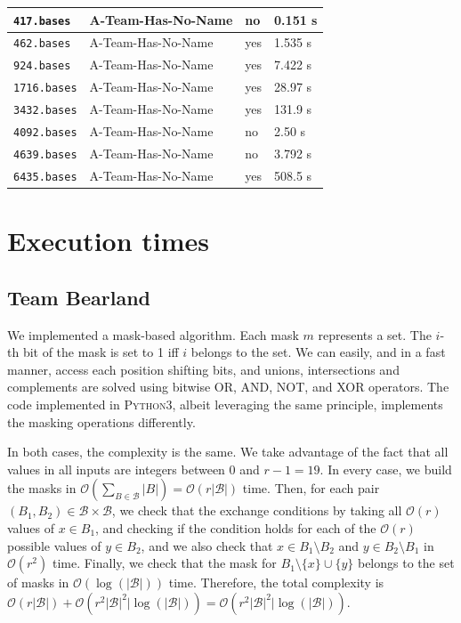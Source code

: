 \documentclass[11pt]{amsart}
\begin{document}
\begin{center}
\begin{tabular}[c]{llll}
    \\\hline
    \texttt{417.bases}
    & A-Team-Has-No-Name
    & no
    & 0.151 s
    \\\hline
    \texttt{462.bases}
    & A-Team-Has-No-Name
    & yes
    & 1.535 s
    \\\hline
    \texttt{924.bases}
    & A-Team-Has-No-Name
    & yes
    & 7.422 s
    \\\hline
    \texttt{1716.bases}
    & A-Team-Has-No-Name
    & yes
    & 28.97 s
    \\\hline
    \texttt{3432.bases}
    & A-Team-Has-No-Name
    & yes
    & 131.9 s
    \\\hline
    \texttt{4092.bases}
    & A-Team-Has-No-Name
    & no
    & 2.50 s
    \\\hline
    \texttt{4639.bases}
    & A-Team-Has-No-Name
    & no
    & 3.792 s
    \\\hline
    \texttt{6435.bases}
    & A-Team-Has-No-Name
    & yes
    & 508.5 s
    \\\hline    
  \end{tabular}
\end{center}

\section{Execution times}

\subsection{Team Bearland}

We implemented a mask-based algorithm.
Each mask $m$ represents a set.
The $i$-th bit of the mask is set to 1 iff $i$ belongs to the set.
We can easily, and in a fast manner, access each position shifting bits, and unions, intersections and complements are solved using bitwise OR, AND, NOT, and XOR operators.
The code implemented in \textsc{Python3}, albeit leveraging the same principle, implements the masking operations differently.
 
In both cases, the complexity is the same. We take advantage of the fact that all values in all inputs are integers between $0$ and $r - 1 = 19$. In every case, we build the masks in $\mathcal{O}(\sum_{B \in \mathcal{B}} |B|) = \mathcal{O}(r|\mathcal{B}|)$ time. Then, for each pair $(B_1, B_2) \in \mathcal{B} \times \mathcal{B}$, we check that the exchange conditions by taking all $\mathcal{O}(r)$ values of $x \in B_1$, and checking if the condition holds for each of the $\mathcal{O}(r)$ possible values of $y \in B_2$, and we also check that $x \in B_1 \setminus B_2$ and $y \in B_2 \setminus B_1$ in $\mathcal{O}(r^2)$ time. Finally, we check that the mask for $B_1 \setminus \{x\} \cup \{y\}$ belongs to the set of masks in $\mathcal{O}(\log(|\mathcal{B}|))$ time. Therefore, the total complexity is $\mathcal{O}(r |\mathcal{B}|) + \mathcal{O}(r^2 |\mathcal{B}|^2| \log(|\mathcal{B}|)) =  \mathcal{O}(r^2 |\mathcal{B}|^2| \log(|\mathcal{B}|))$.
\end{document}
